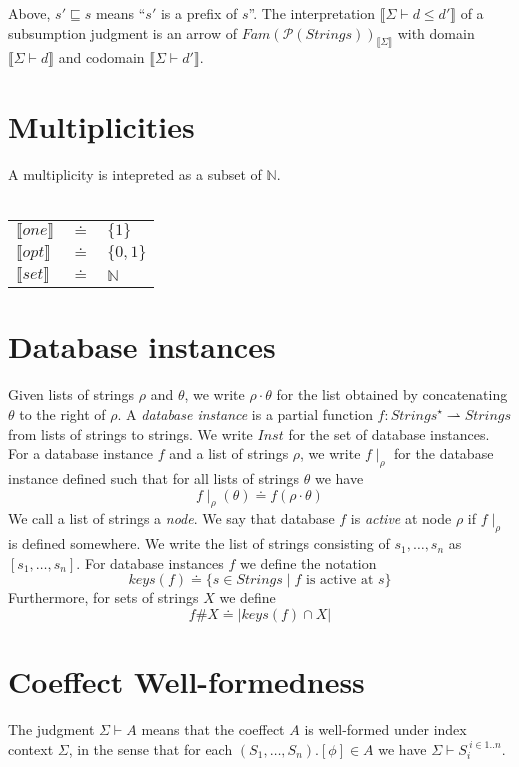 \documentclass{article}
\newcommand{\sem}[1]{\llbracket #1 \rrbracket}
\begin{document}
Above, $s' \sqsubseteq s$ means ``$s'$ is a prefix of $s$''. 
The interpretation $\sem{\Sigma \vdash d \leq d'}$ of a subsumption judgment is an arrow of $\mathit{Fam}(\mathcal P(\mathit{Strings}))_{\sem{\Sigma}}$ with domain $\sem{\Sigma \vdash d}$ and codomain $\sem{\Sigma \vdash d'}$.

\section*{Multiplicities}

A multiplicity is intepreted as a subset of $\mathbb N$.\\~\\
\begin{tabular}{lll}
$\sem{one}$ & $\doteq$ & $\{ 1 \}$ \\
$\sem{opt}$ & $\doteq$ & $\{ 0, 1 \}$ \\
$\sem{set}$ & $\doteq$ & $\mathbb N$
\end{tabular}
\section*{Database instances}

Given lists of strings $\rho$ and $\theta$, we write $\rho \cdot \theta$ for the list obtained by concatenating $\theta$ to the right of $\rho$. A \emph{database instance} is a partial function $f : \mathit{Strings}^{\star} \rightharpoonup \mathit{Strings}$ from lists of strings to strings. We write $\mathit{Inst}$ for the set of database instances. For a database instance $f$ and a list of strings $\rho$, we write $f \! \mid_\rho$ for the database instance defined such that for all lists of strings $\theta$ we have $$f \! \mid_\rho \! (\theta) \doteq f(\rho \cdot \theta)$$ We call a list of strings a \emph{node}. We say that database $f$ is \emph{active} at node $\rho$ if $f \! \mid_\rho$ is defined somewhere. We write the list of strings consisting of $s_1, \ldots, s_n$ as $[s_1,\ldots,s_n]$. For database instances $f$ we define the notation $$\mathit{keys}(f) \doteq \{ s \in \mathit{Strings} \mid f \text{ is active at } s \}$$ Furthermore, for sets of strings $X$ we define
$$f \# X \doteq | \mathit{keys}(f) \cap X |$$ 


\section*{Coeffect Well-formedness}

The judgment $\Sigma \vdash A$ means that the coeffect $A$ is well-formed under index context $\Sigma$,
in the sense that for each $(S_1,\ldots,S_n).[\phi] \in A$ we have $\Sigma \vdash S_i^{~i \in 1..n}$.
\end{document}

